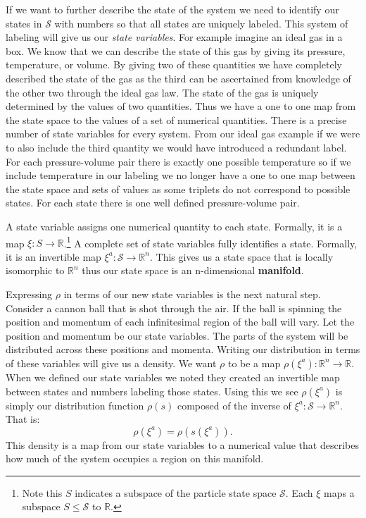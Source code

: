 \documentclass{article}
\begin{document}
	If we want to further describe the state of the system we need to identify our states in $\mathcal{S}$ with numbers so that all states are uniquely labeled. This system of labeling will give us our \textit{state variables}. For example imagine an ideal gas in a box. We know that we can describe the state of this gas by giving its pressure, temperature, or volume. By giving two of these quantities we have completely described the state of the gas as the third can be ascertained from knowledge of the other two through the ideal gas law. The state of the gas is uniquely determined by the values of two quantities. Thus we have a one to one map from the state space to the values of a set of numerical quantities. There is a precise number of state variables for every system. From our ideal gas example if we were to also include the third quantity we would have introduced a redundant label. For each pressure-volume pair there is exactly one possible temperature so if we include temperature in our labeling we no longer have a one to one map between the state space and sets of values as some triplets do not correspond to possible states. For each state there is one well defined pressure-volume pair. 

\begin{defn}
	A state variable assigns one numerical quantity to each state. Formally, it is a map $\xi : S \to \mathbb{R}$.\footnote{Note this $S$ indicates a subspace of the particle state space $\mathcal{S}$. Each $\xi$ maps a subspace  $S \le \mathcal{S}$ to $\mathbb{R}$.} A complete set of state variables fully identifies a state. Formally, it is an invertible  map $\xi^a : \mathcal{S} \rightarrow \mathbb{R}^n $. This gives us a state space that is locally isomorphic to $\mathbb{R}^n$ thus our state space is an n-dimensional \textbf{manifold}.
\end{defn}

		
	Expressing $\rho$ in terms of our new state variables is the next natural step. Consider a cannon ball that is shot through the air. If the ball is spinning the position and momentum of each infinitesimal region of the ball will vary. Let the position and momentum be our state variables. The parts of the system will be distributed across these positions and momenta. Writing our distribution in terms of these variables will give us a density. We want $\rho$ to be a map $\rho(\xi^a): \mathbb{R}^n \to \mathbb{R}$. When we defined our state variables we noted they created an invertible map between states and numbers labeling those states. Using this we see $\rho(\xi^a)$ is simply our distribution function $\rho(s)$ composed of the inverse of $\xi^a: \mathcal{S}\to \mathbb{R}^n$. That is: $$\rho(\xi^a) = \rho(s(\xi^a)).$$ This density is a map from our state variables to a numerical value that describes how much of the system occupies a region on this manifold.
	
\end{document}
